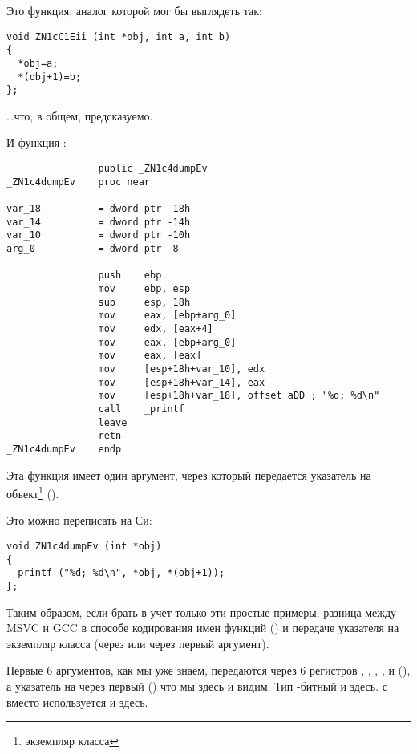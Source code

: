 Это функция, аналог которой мог бы выглядеть так:

\begin{lstlisting}
void ZN1cC1Eii (int *obj, int a, int b)
{
  *obj=a;
  *(obj+1)=b;
};
\end{lstlisting}

\dots что, в общем, предсказуемо.

И функция :

\begin{lstlisting}
                public _ZN1c4dumpEv
_ZN1c4dumpEv    proc near

var_18          = dword ptr -18h
var_14          = dword ptr -14h
var_10          = dword ptr -10h
arg_0           = dword ptr  8

                push    ebp
                mov     ebp, esp
                sub     esp, 18h
                mov     eax, [ebp+arg_0]
                mov     edx, [eax+4]
                mov     eax, [ebp+arg_0]
                mov     eax, [eax]
                mov     [esp+18h+var_10], edx
                mov     [esp+18h+var_14], eax
                mov     [esp+18h+var_18], offset aDD ; "%d; %d\n"
                call    _printf
                leave
                retn
_ZN1c4dumpEv    endp
\end{lstlisting}

Эта функция  имеет один аргумент, через который передается указатель на 
объект\footnote{экземпляр класса} (\ITthis).

Это можно переписать на Си:

\begin{lstlisting}
void ZN1c4dumpEv (int *obj)
{
  printf ("%d; %d\n", *obj, *(obj+1));
};
\end{lstlisting}

Таким образом, если брать в учет только эти простые примеры, разница между MSVC и GCC 
в способе кодирования имен функций () и передаче указателя на экземпляр класса 
(через \ECX или через первый аргумент).


Первые 6 аргументов, как мы уже знаем, передаются через 6 регистров \RDI, \RSI, \RDX, \RCX,  и 
 (\SysVABI), а указатель на \ITthis через первый (\RDI) что мы здесь и видим.
Тип -битный и здесь.
 с \JMP вместо \RET используется и здесь.



